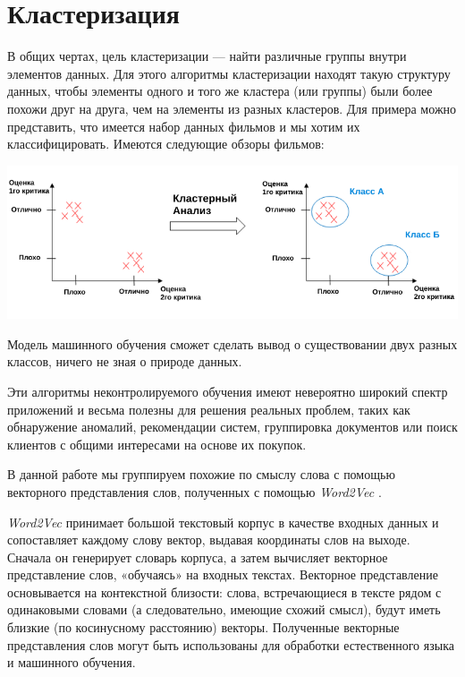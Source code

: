 \section{Кластеризация}

В общих чертах, цель кластеризации --- найти различные группы внутри элементов данных. Для этого алгоритмы кластеризации находят такую структуру данных, чтобы элементы одного и того же кластера (или группы) были более похожи друг на друга, чем на элементы из разных кластеров. Для примера можно представить, что имеется набор данных фильмов и мы хотим их классифицировать. Имеются следующие обзоры фильмов:

\begin{center}
\includegraphics[scale=0.5]{pics/clustering.png}
\end{center}

Модель машинного обучения сможет сделать вывод о существовании двух разных классов, ничего не зная о природе данных.

Эти алгоритмы неконтролируемого обучения имеют невероятно широкий спектр приложений и весьма полезны для решения реальных проблем, таких как обнаружение аномалий, рекомендации систем, группировка документов или поиск клиентов с общими интересами на основе их покупок.

В данной работе мы группируем похожие по смыслу слова с помощью векторного представления слов, полученных с помощью \textit{Word2Vec} \cite{bib5}. 

\textit{Word2Vec} принимает большой текстовый корпус в качестве входных данных и сопоставляет каждому слову вектор, выдавая координаты слов на выходе. Сначала он генерирует словарь корпуса, а затем вычисляет векторное представление слов, «обучаясь» на входных текстах. Векторное представление основывается на контекстной близости: слова, встречающиеся в тексте рядом с одинаковыми словами (а следовательно, имеющие схожий смысл), будут иметь близкие (по косинусному расстоянию) векторы. Полученные векторные представления слов могут быть использованы для обработки естественного языка и машинного обучения.